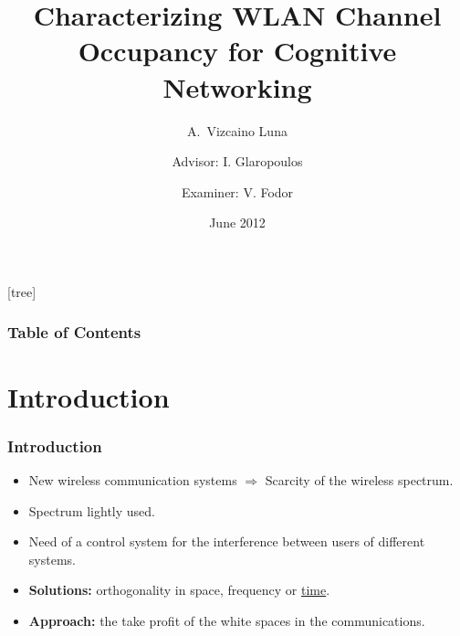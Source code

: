 \documentclass[9pt,handout,serif]{beamer}
\title[Characterizing WLAN Channel Occupancy
for Cognitive Networking]%
{\textbf{Characterizing WLAN Channel Occupancy
for Cognitive Networking}}
\author[Vizcaino Luna, A.] %
{A.~Vizcaino Luna \and \linebreak \linebreak Advisor: I. Glaropoulos \and \linebreak Examiner: V. Fodor}
\institute[Kungliga Tekniska Högskolan] %
{
  School of Electrical Engineering\\
  Kungliga Tekniska Högskolan
}
\date[2012] %
{June 2012}
\begin{document}
[tree] 
\begin{frame}
	\titlepage
\end{frame}

\begin{frame}
	\frametitle{Table of Contents}
	\scriptsize
	\tableofcontents
\end{frame}

\section{Introduction}

\begin{frame}[c]
	\frametitle{Introduction}
	\begin{itemize}
		\item New wireless communication systems $\Rightarrow$ Scarcity of the wireless spectrum.
		\item Spectrum lightly used.
		\item Need of a control system for the interference between users of different systems.
		\item \textbf{Solutions:} orthogonality in space, frequency or \underline{time}.
		\item \textbf{Approach:} the take profit of the white spaces in the communications.
	\end{itemize}
\end{frame}
\end{document}
